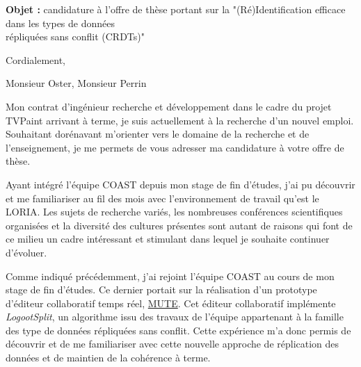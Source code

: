 \documentclass[11pt,a4paper,sans]{moderncv}        %
\newcommand{\customboldlink}[1]{\color{href} #1}
\newcommand{\tab}{\quad \quad}
\begin{document}
\date{À Nancy, le 21 mai 2017}
\opening{
  \textbf{Objet :} candidature à l'offre de thèse portant sur la "(Ré)Identification efficace dans les types de données\\
  \hspace{13mm}    répliquées sans conflit (CRDTs)"
}
\closing{Cordialement,}
\makelettertitle

Monsieur Oster, Monsieur Perrin

\justify
\tab Mon contrat d'ingénieur recherche et développement dans le cadre du projet TVPaint arrivant à terme,
je suis actuellement à la recherche d'un nouvel emploi.
Souhaitant dorénavant m'orienter vers le domaine de la recherche et de l'enseignement,
je me permets de vous adresser ma candidature à votre offre de thèse.

%
%
\tab Ayant intégré l'équipe COAST depuis mon stage de fin d'études,
j'ai pu découvrir et me familiariser au fil des mois avec l'environnement de travail qu'est le LORIA.
Les sujets de recherche variés, les nombreuses conférences scientifiques organisées
et la diversité des cultures présentes sont autant de raisons
qui font de ce milieu un cadre intéressant et stimulant dans lequel je souhaite continuer d'évoluer.

%
%
\tab Comme indiqué précédemment, j'ai rejoint l'équipe COAST au cours de mon stage de fin d'études.
Ce dernier portait sur la réalisation d'un prototype d'éditeur collaboratif temps réel,
\href{https://www.coedit.re}{\customboldlink MUTE}.
Cet éditeur collaboratif implémente \emph{LogootSplit},
un algorithme issu des travaux de l'équipe appartenant à la famille des type de données répliquées sans conflit.
Cette expérience m'a donc permis de découvrir
et de me familiariser avec cette nouvelle approche
de réplication des données et de maintien de la cohérence à terme.
\end{document}
